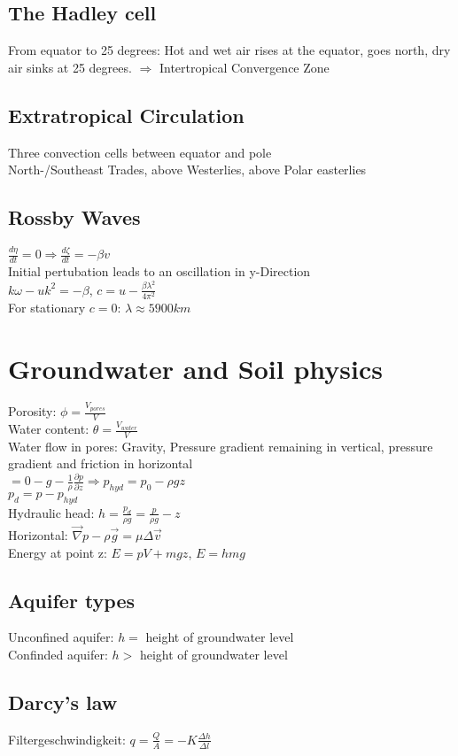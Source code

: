 \subsection*{The Hadley cell}
From equator to 25 degrees: Hot and wet air rises at the equator, goes north, dry air sinks at 25 degrees. $\Rightarrow$ Intertropical Convergence Zone
\subsection*{Extratropical Circulation}
Three convection cells between equator and pole\\
North-/Southeast Trades, above Westerlies, above Polar easterlies
\subsection*{Rossby Waves}
$\frac{d\eta}{dt}=0\Rightarrow\frac{d\zeta}{dt}=-\beta v$\\
Initial pertubation leads to an oscillation in y-Direction\\
$k\omega-uk^2=-\beta$, $c=u-\frac{\beta \lambda^2}{4\pi^2}$\\
For stationary $c=0$: $\lambda\approx 5900km$
\section*{Groundwater and Soil physics}
Porosity: $\phi=\frac{V_{pores}}{V}$\\
Water content: $\theta = \frac{V_{water}}{V}$\\
Water flow in pores: Gravity, Pressure gradient remaining in vertical, pressure gradient and friction in horizontal\\
$=0-g-\frac{1}{\rho}\frac{\partial p}{\partial z} \Rightarrow p_{hyd}=p_0-\rho g z$\\
$p_d = p-p_{hyd}$\\
Hydraulic head: $h=\frac{p_d}{\rho g}=\frac{p}{\rho g}-z$\\
Horizontal: $\vec{\nabla}p-\rho\vec{g}=\mu\Delta\vec{v}$\\
Energy at point z: $E=pV+mgz$, $E=hmg$
\subsection*{Aquifer types}
Unconfined aquifer: $h=$ height of groundwater level\\
Confinded aquifer: $h>$ height of groundwater level
\subsection*{Darcy's law}
Filtergeschwindigkeit: $q=\frac{Q}{A}=-K\frac{\Delta h}{\Delta l}$
